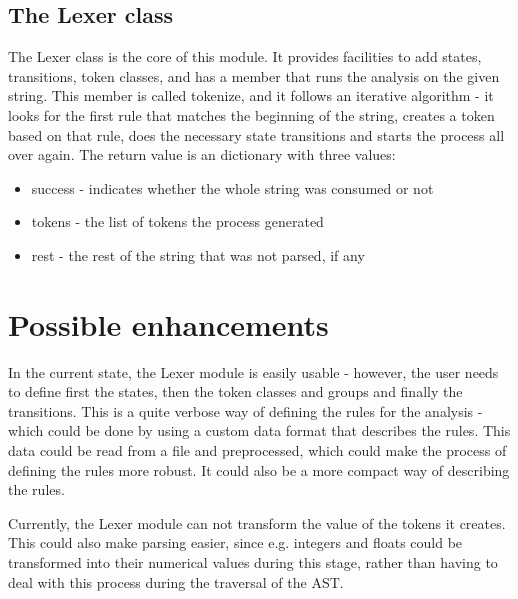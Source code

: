 \subsection{The Lexer class}
The Lexer class is the core of this module. It provides facilities to add states, transitions, token classes, and has a member that runs the analysis on the given string. This member is called tokenize, and it follows an iterative algorithm - it looks for the first rule that matches the beginning of the string, creates a token based on that rule, does the necessary state transitions and starts the process all over again. The return value is an dictionary with three values:
\begin{itemize}
\item success - indicates whether the whole string was consumed or not
\item tokens - the list of tokens the process generated
\item rest - the rest of the string that was not parsed, if any
\end{itemize}
\section{Possible enhancements}
In the current state, the Lexer module is easily usable - however, the user needs to define first the states, then the token classes and groups and finally the transitions. This is a quite verbose way of defining the rules for the analysis - which could be done by using a custom data format that describes the rules. This data could be read from a file and preprocessed, which could make the process of defining the rules more robust. It could also be a more compact way of describing the rules.

Currently, the Lexer module can not transform the value of the tokens it creates. This could also make parsing easier, since e.g. integers and floats could be transformed into their numerical values during this stage, rather than having to deal with this process during the traversal of the AST.